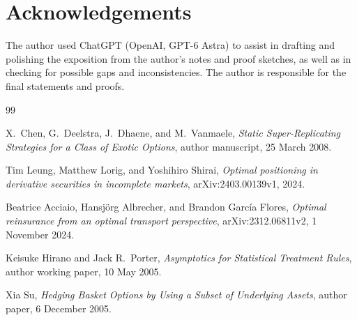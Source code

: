 \documentclass[11pt,a4paper]{amsart}
\theoremstyle{plain}
\theoremstyle{definition}
\theoremstyle{remark}
\begin{document}
\section*{Acknowledgements}

The author used ChatGPT (OpenAI, GPT-6 Astra) to assist in drafting and
polishing the exposition from the author's notes and proof sketches, as well
as in checking for possible gaps and inconsistencies. The author is
responsible for the final statements and proofs.

\begin{thebibliography}{99}

X.~Chen, G.~Deelstra, J.~Dhaene, and M.~Vanmaele,
\emph{Static Super-Replicating Strategies for a Class of Exotic Options},
author manuscript, 25 March 2008.

Tim Leung, Matthew Lorig, and Yoshihiro Shirai,
\emph{Optimal positioning in derivative securities in incomplete markets},
arXiv:2403.00139v1, 2024.

Beatrice Acciaio, Hansj\"org Albrecher, and Brandon Garc\'ia Flores,
\emph{Optimal reinsurance from an optimal transport perspective},
arXiv:2312.06811v2, 1 November 2024.

Keisuke Hirano and Jack R.~Porter,
\emph{Asymptotics for Statistical Treatment Rules},
author working paper, 10 May 2005.

Xia Su,
\emph{Hedging Basket Options by Using a Subset of Underlying Assets},
author paper, 6 December 2005.

\end{thebibliography}
\end{document}
